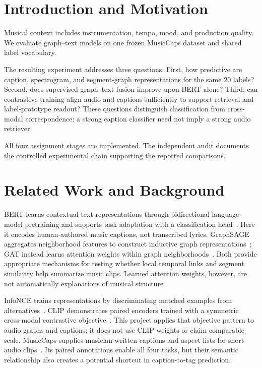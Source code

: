 \documentclass[conference]{IEEEtran}
\begin{document}
\section{Introduction and Motivation}\label{sec:intro}
Musical context includes instrumentation, tempo, mood, and production quality. We evaluate graph--text models on one frozen MusicCaps dataset and shared label vocabulary.

The resulting experiment addresses three questions. First, how predictive are caption, spectrogram, and segment-graph representations for the same 20 labels? Second, does supervised graph--text fusion improve upon BERT alone? Third, can contrastive training align audio and captions sufficiently to support retrieval and label-prototype readout? These questions distinguish classification from cross-modal correspondence: a strong caption classifier need not imply a strong audio retriever.

All four assignment stages are implemented. The independent audit documents the controlled experimental chain supporting the reported comparisons.

\section{Related Work and Background}\label{sec:background}
BERT learns contextual text representations through bidirectional language-model pretraining and supports task adaptation with a classification head~\cite{bert}. Here it encodes human-authored music captions, not transcribed lyrics. GraphSAGE aggregates neighborhood features to construct inductive graph representations~\cite{sage}; GAT instead learns attention weights within graph neighborhoods~\cite{gat}. Both provide appropriate mechanisms for testing whether local temporal links and segment similarity help summarize music clips. Learned attention weights, however, are not automatically explanations of musical structure.

InfoNCE trains representations by discriminating matched examples from alternatives~\cite{cpc}. CLIP demonstrates paired encoders trained with a symmetric cross-modal contrastive objective~\cite{clip}. This project applies that objective pattern to audio graphs and captions; it does not use CLIP weights or claim comparable scale. MusicCaps supplies musician-written captions and aspect lists for short audio clips~\cite{musiccaps,musiclm}. Its paired annotations enable all four tasks, but their semantic relationship also creates a potential shortcut in caption-to-tag prediction.
\end{document}

